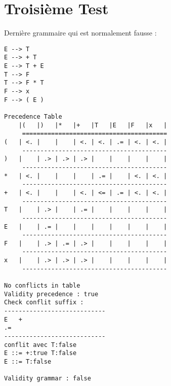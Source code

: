\section{Troisième Test}
Dernière grammaire qui est normalement fausse :
{\tiny
\begin{verbatim}
E --> T 
E --> + T 
E --> T + E 
T --> F 
T --> F * T 
F --> x 
F --> ( E ) 

Precedence Table
    |(   |)   |*   |+   |T   |E   |F   |x   |
     ========================================
(   | <. |    |    | <. | <. | .= | <. | <. |
     ----------------------------------------
)   |    | .> | .> | .> |    |    |    |    |
     ----------------------------------------
*   | <. |    |    |    | .= |    | <. | <. |
     ----------------------------------------
+   | <. |    |    | <. | <= | .= | <. | <. |
     ----------------------------------------
T   |    | .> |    | .= |    |    |    |    |
     ----------------------------------------
E   |    | .= |    |    |    |    |    |    |
     ----------------------------------------
F   |    | .> | .= | .> |    |    |    |    |
     ----------------------------------------
x   |    | .> | .> | .> |    |    |    |    |
     ----------------------------------------

No conflicts in table
Validity precedence : true
Check conflit suffix : 
----------------------------
E   +
.=
----------------------------
conflit avec T:false
E ::= +:true T:false
E ::= T:false 

Validity grammar : false
\end{verbatim}
}
